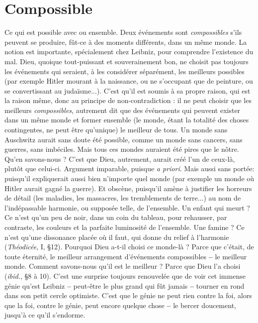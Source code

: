 \section{Compossible}
Ce qui est possible avec ou ensemble. Deux événements
sont {\it compossibles} s'ils peuvent se produire, fût-ce à des
moments différents, dans un même monde. La notion est importante, spécialement
chez Leibniz, pour comprendre l’existence du mal. Dieu, quoique tout-puissant
et souverainement bon, ne choisit pas toujours les événements qui
seraient, à les considérer séparément, les meilleurs possibles (par exemple Hitler
mourant à la naissance, ou ne s’occupant que de peinture, ou se convertissant
au judaïsme...). C’est qu’il est soumis à sa propre raison, qui est la raison
même, donc au principe de non-contradiction : il ne peut choisir que les
meilleurs {\it compossibles}, autrement dit que des événements qui peuvent exister
dans un même monde et former ensemble (le monde, étant la totalité des
choses contingentes, ne peut être qu’unique) le meilleur de tous. Un monde
sans Auschwitz aurait sans doute été possible, comme un monde sans cancers,
sans guerres, sans imbéciles. Mais tous ces mondes auraient été pires que le
nôtre. Qu’en savons-nous ? C’est que Dieu, autrement, aurait créé l’un de
ceux-là, plutôt que celui-ci. Argument imparable, puisque {\it a priori}. Mais aussi
sans portée: puisqu'il expliquerait aussi bien n’importe quel monde (par
exemple un monde où Hitler aurait gagné la guerre). Et obscène, puisqu'il
amène à justifier les horreurs de détail (les maladies, les massacres, les tremblements
de terre...) au nom de l’indépassable harmonie, ou supposée telle, de
l’ensemble. Un enfant qui meurt ? Ce n’est qu’un peu de noir, dans un coin du
tableau, pour rehausser, par contraste, les couleurs et la parfaite luminosité de
l’ensemble. Une famine ? Ce n’est qu’une dissonance placée où il faut, qui
donne du relief à l’harmonie ({\it Théodicée}, I, \S 12). Pourquoi Dieu a-t-il choisi ce
monde-là ? Parce que c'était, de toute éternité, le meilleur arrangement d’événements
compossibles {\bf --} le meilleur monde. Comment savons-nous qu’il est le
meilleur ? Parce que Dieu l’a choisi ({\it ibid.}, \S 8 à 10). C’est une surprise toujours
renouvelée que de voir cet immense génie qu’est Leibniz {\bf --} peut-être le plus
grand qui fût jamais {\bf --} tourner en rond dans son petit cercle optimiste. C’est
que le génie ne peut rien contre la foi, alors que la foi, contre le génie, peut
encore quelque chose {\bf --} le bercer doucement, jusqu’à ce qu’il s’endorme.


